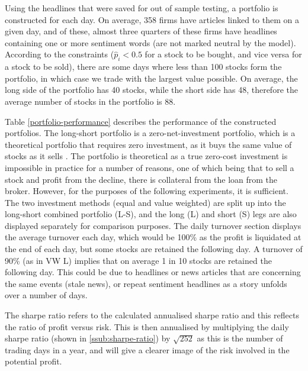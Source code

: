 Using the headlines that were saved for out of sample testing, a portfolio is constructed for each day. On average, 358 firms have articles linked to them on a given day, and of these, almost three quarters of these firms have headlines containing one or more sentiment words (are not marked neutral by the model). According to the constraints ($\widehat p_i < 0.5$ for a stock to be bought, and vice versa for a stock to be sold), there are some days where less than 100 stocks form the portfolio, in which case we trade with the largest value possible. On average, the long side of the portfolio has 40 stocks, while the short side has 48, therefore the average number of stocks in the portfolio is 88.

Table \ref{portfolio-performance} describes the performance of the constructed portfolios. The long-short portfolio is a zero-net-investment portfolio, which is a theoretical portfolio that requires zero investment, as it buys the same value of stocks as it sells \parencite{zero-net}. The portfolio is theoretical as a true zero-cost investment is impossible in practice for a number of reasons, one of which being that to sell a stock and profit from the decline, there is collateral from the loan from the broker. However, for the purposes of the following experiments, it is sufficient. The two investment methods (equal and value weighted) are split up into the long-short combined portfolio (L-S), and the long (L) and short (S) legs are also displayed separately for comparison purposes. The daily turnover section displays the average turnover each day, which would be 100\% as the profit is liquidated at the end of each day, but some stocks are retained the following day. A turnover of 90\% (as in VW L) implies that on average 1 in 10 stocks are retained the following day. This could be due to headlines or news articles that are concerning the same events (stale news), or repeat sentiment headlines as a story unfolds over a number of days.

The sharpe ratio refers to the calculated annualised sharpe ratio and this reflects the ratio of profit versus risk. This is then annualised by multiplying the daily sharpe ratio (shown in \ref{ssub:sharpe-ratio}) by $\sqrt{252}$ as this is the number of trading days in a year, and will give a clearer image of the risk involved in the potential profit.


